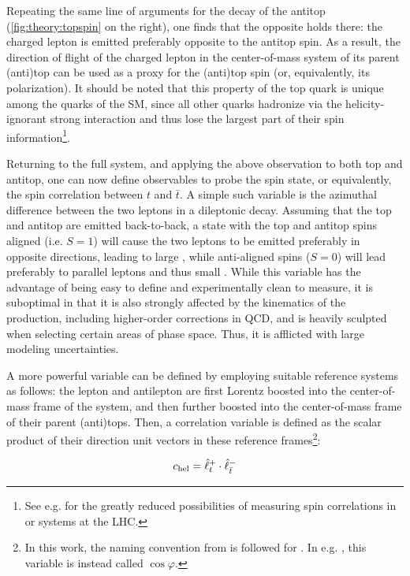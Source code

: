 Repeating the same line of arguments for the decay of the antitop (\cref{fig:theory:topspin} on the right), one finds that the opposite holds there: the charged lepton is emitted preferably opposite to the antitop spin. As a result, the direction of flight of the charged lepton in the center-of-mass system of its parent (anti)top can be used as a proxy for the (anti)top spin (or, equivalently, its polarization). It should be noted that this property of the top quark is unique among the quarks of the SM, since all other quarks hadronize via the helicity-ignorant strong interaction and thus lose the largest part of their spin information\footnote{See e.g.  for the greatly reduced possibilities of measuring spin correlations in \bbbar or \ccbar systems at the LHC.}.

Returning to the full \ttbar system, and applying the above observation to both top and antitop, one can now define observables to probe the \ttbar spin state, or equivalently, the spin correlation between $t$ and $\bar{t}$. A simple such variable is the azimuthal difference \dphill between the two leptons in a dileptonic decay. Assuming that the top and antitop are emitted back-to-back, a state with the top and antitop spins aligned (i.e. $S=1$) will cause the two leptons to be emitted preferably in opposite directions, leading to large \dphill, while anti-aligned spins ($S=0$) will lead preferably to parallel leptons and thus small \dphill. While this variable has the advantage of being easy to define and experimentally clean to measure, it is suboptimal in that it is also strongly affected by the kinematics of the \ttbar production, including higher-order corrections in QCD, and is heavily sculpted when selecting certain areas of \ttbar phase space. Thus, it is afflicted with large modeling uncertainties.

A more powerful variable can be defined by employing suitable reference systems as follows: the lepton and antilepton are first Lorentz boosted into the center-of-mass frame of the \ttbar system, and then further boosted into the center-of-mass frame of their parent (anti)tops. Then, a correlation variable \chel is defined as the scalar product of their direction unit vectors in these reference frames\footnote{
In this work, the naming convention from  is followed for \chel. In e.g. , this variable is instead called $\cos \varphi$.
}:

\begin{equation}
\label{eq:theory:cheldef}
    c_{\mathrm{hel}} = \hat{\ell}^+_{t} \cdot \hat{\ell}^-_{\bar{t}} 
\end{equation}

